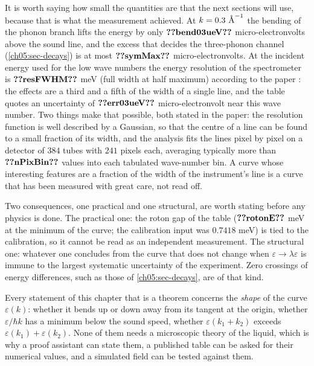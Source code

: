 It is worth saying how small the quantities are that the next sections will use, because that is what the measurement achieved.
At $k=0.3\ \text{\AA}^{-1}$ the bending of the phonon branch lifts the energy by only $\cfiveV{bend03ueV}$ micro-electronvolts above the sound line, and the excess that decides the three-phonon channel (\cref{ch05:sec-decays}) is at most $\cfiveV{symMax}$ micro-electronvolts.
At the incident energy used for the low wave numbers the energy resolution of the spectrometer is $\cfiveV{resFWHM}$ meV (full width at half maximum) according to the paper \cite{Godfrin2021}: the effects are a third and a fifth of the width of a single line, and the table quotes an uncertainty of $\cfiveV{err03ueV}$ micro-electronvolt near this wave number.
Two things make that possible, both stated in the paper: the resolution function is well described by a Gaussian, so that the centre of a line can be found to a small fraction of its width, and the analysis fits the lines pixel by pixel on a detector of $384$ tubes with $241$ pixels each, averaging typically more than $\cfiveV{nPixBin}$ values into each tabulated wave-number bin.
A curve whose interesting features are a fraction of the width of the instrument's line is a curve that has been measured with great care, not read off.

Two consequences, one practical and one structural, are worth stating before any physics is done.
The practical one: the roton gap of the table ($\cfiveV{rotonE}$ meV at the minimum of the curve; the calibration input was $0.7418$ meV) is tied to the calibration, so it cannot be read as an independent measurement.
The structural one: whatever one concludes from the curve that does not change when $\varepsilon\to\lambda\varepsilon$ is immune to the largest systematic uncertainty of the experiment.
Zero crossings of energy differences, such as those of \cref{ch05:sec-decays}, are of that kind.

\begin{keybox}
Every statement of this chapter that is a theorem concerns the \emph{shape} of the curve $\varepsilon(k)$: whether it bends up or down away from its tangent at the origin, whether $\varepsilon/\hbar k$ has a minimum below the sound speed, whether $\varepsilon(k_1+k_2)$ exceeds $\varepsilon(k_1)+\varepsilon(k_2)$.
None of them needs a microscopic theory of the liquid, which is why a proof assistant can state them, a published table can be asked for their numerical values, and a simulated field can be tested against them.
\end{keybox}

